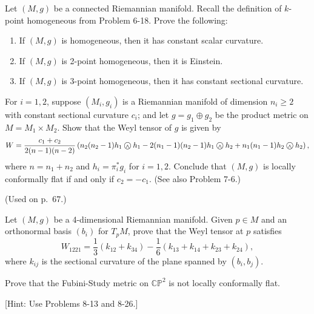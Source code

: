 \begin{exercise}
\label{prob:k-point-homogeneous-ch8}
Let $(M,g)$ be a connected Riemannian manifold. Recall the definition of $k$-point homogeneous from Problem 6-18. Prove the following:
\begin{enumerate}
\item[(a)] If $(M,g)$ is homogeneous, then it has constant scalar curvature.
\item[(b)] If $(M,g)$ is 2-point homogeneous, then it is Einstein.
\item[(c)] If $(M,g)$ is 3-point homogeneous, then it has constant sectional curvature.
\end{enumerate}
\end{exercise}

\begin{exercise}
\label{prob:weyl-tensor-product-metric}
For $i = 1,2$, suppose $(M_i, g_i)$ is a Riemannian manifold of dimension $n_i \ge 2$ with constant sectional curvature $c_i$; and let $g = g_1 \oplus g_2$ be the product metric on $M = M_1 \times M_2$. Show that the Weyl tensor of $g$ is given by
\[
W = \frac{c_1 + c_2}{2(n-1)(n-2)} \left( n_2(n_2-1)h_1 \owedge h_1 - 2(n_1-1)(n_2-1)h_1 \owedge h_2 + n_1(n_1-1)h_2 \owedge h_2 \right),
\]
where $n = n_1 + n_2$ and $h_i = \pi_i^* g_i$ for $i = 1,2$. Conclude that $(M,g)$ is locally conformally flat if and only if $c_2 = -c_1$. (See also Problem 7-6.)

(Used on p.~67.)
\end{exercise}

\begin{exercise}
\label{prob:weyl-tensor-4d}
Let $(M,g)$ be a 4-dimensional Riemannian manifold. Given $p \in M$ and an orthonormal basis $(b_i)$ for $T_p M$, prove that the Weyl tensor at $p$ satisfies
\[
W_{1221} = \frac{1}{3}(k_{12} + k_{34}) - \frac{1}{6}(k_{13} + k_{14} + k_{23} + k_{24}),
\]
where $k_{ij}$ is the sectional curvature of the plane spanned by $(b_i, b_j)$.
\end{exercise}

\begin{exercise}
\label{prob:fubini-study-not-conformal-flat}
Prove that the Fubini-Study metric on $\mathbb{CP}^2$ is not locally conformally flat.

[Hint: Use Problems 8-13 and 8-26.]
\end{exercise}

